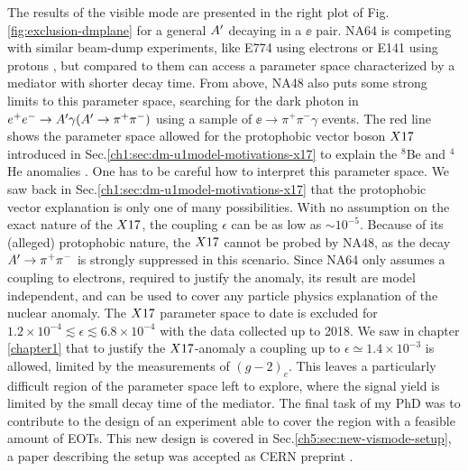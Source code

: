 The results of the visible mode are presented in the right plot of Fig.\ref{fig:exclusion-dmplane} for a general $A'$ decaying in a $\ee$ pair. NA64 is competing with similar beam-dump experiments, like E774 using electrons \cite{PhysRevLett.67.2942} or E141 using protons \cite{PhysRevLett.59.755}, but compared to them can access a parameter space characterized by a mediator with shorter decay time. From above, NA48 also puts some strong limits to this parameter space, searching for the dark photon in $e^+e^- \to A' \gamma (A' \to \pi^+ \pi^-)$ using a sample of $\ee \to \pi^+ \pi^- \gamma$ events. The red line shows the parameter space allowed for the protophobic vector boson $X17$ introduced in Sec.\ref{ch1:sec:dm-u1model-motivations-x17} to explain the $^8$Be and $^4$He anomalies \cite{Krasznahorkay:2015iga,Krasznahorkay:2019lyl}.
One has to be careful how to interpret this parameter space. We saw back in Sec.\ref{ch1:sec:dm-u1model-motivations-x17} that the protophobic vector explanation is only one of many possibilities. With no assumption on the exact nature of the $X17$, the coupling $\epsilon$ can be as low as $\sim 10^{-5}$. Because of its (alleged) protophobic nature, the $X17$ cannot be probed by NA48, as the decay $A' \to \pi^+ \pi^-$ is strongly suppressed in this scenario. Since NA64 only assumes a coupling to electrons, required to justify the anomaly, its result are model independent, and can be used to cover any particle physics explanation of the nuclear anomaly. The $X17$ parameter space to date is excluded for $1.2 \times 10^{-4} \lesssim \epsilon \lesssim 6.8 \times 10^{-4}$ with the data collected up to 2018. We saw in chapter \ref{chapter1} that to justify the $X17$-anomaly a coupling up to $\epsilon \simeq 1.4 \times 10^{-3}$ is allowed, limited by the measurements of $(g-2)_e$. This leaves a particularly difficult region of the parameter space left to explore, where the signal yield is limited by the small decay time of the mediator. The final task of my PhD was to contribute to the design of an experiment able to cover the region with a feasible amount of EOTs. This new design is covered in Sec.\ref{ch5:sec:new-vismode-setup}, a paper describing the setup was accepted as CERN preprint \cite{Depero:2020zfy}.


